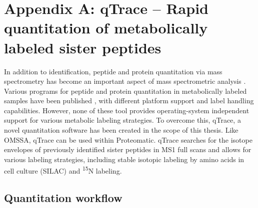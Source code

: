 \cleardoublepage
\chapter*{Appendix A: qTrace -- Rapid quantitation of metabolically labeled sister peptides}
\label{appendix-qtrace}

In addition to identification, peptide and protein quantitation via mass 
spectrometry has become an important aspect of mass spectrometric analysis 
\citep{Kline2010, Schulze2010}. 
Various programs for peptide and protein quantitation in metabolically labeled 
samples have been published \citep{Han2001, Li2003, Saito2007, Park2008, 
Cox2008, Mortensen2010}, with different platform support and label handling 
capabilities. 
However, none of these tool provides operating-system independent support
for various metabolic labeling strategies.
To overcome this, qTrace, a novel quantitation software has been 
created in the scope of this thesis.
Like OMSSA, qTrace can be 
used within Proteomatic.
qTrace searches for the isotope envelopes of previously identified sister 
peptides in MS1 full scans and allows for various labeling strategies, 
including stable isotopic labeling by amino acids in cell culture (SILAC) 
and \textsuperscript{15}N labeling.

\section*{Quantitation workflow}

